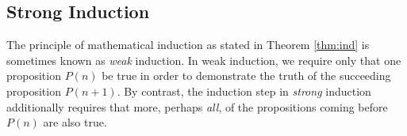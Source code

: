 \begin{enumerate}
% 
\end{enumerate}
\newpage


\subsection{Strong Induction}

The principle of mathematical induction as stated in Theorem \ref{thm:ind} is sometimes known as \emph{weak} induction. In weak induction, we require only that one proposition $P(n)$ be true in order to demonstrate the truth of the succeeding proposition $P(n+1)$. By contrast, the induction step in \emph{strong} induction additionally requires that more, perhaps \emph{all}, of the propositions coming before $P(n)$ are also true.

